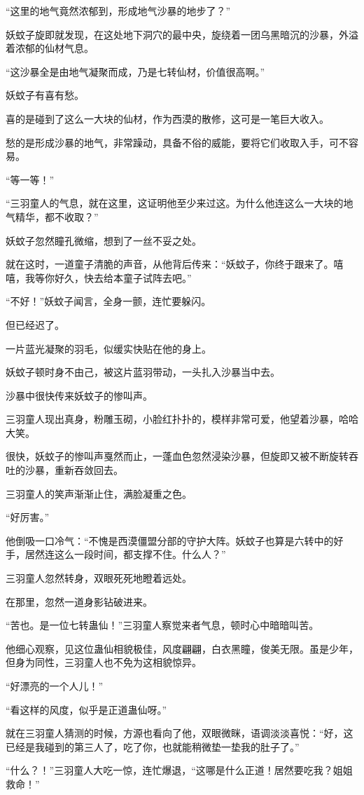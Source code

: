 \begin{this_body}
“这里的地气竟然浓郁到，形成地气沙暴的地步了？”

妖蚊子旋即就发现，在这处地下洞穴的最中央，旋绕着一团乌黑暗沉的沙暴，外溢着浓郁的仙材气息。

“这沙暴全是由地气凝聚而成，乃是七转仙材，价值很高啊。”

妖蚊子有喜有愁。

喜的是碰到了这么一大块的仙材，作为西漠的散修，这可是一笔巨大收入。

愁的是形成沙暴的地气，非常躁动，具备不俗的威能，要将它们收取入手，可不容易。

“等一等！”

“三羽童人的气息，就在这里，这证明他至少来过这。为什么他连这么一大块的地气精华，都不收取？”

妖蚊子忽然瞳孔微缩，想到了一丝不妥之处。

就在这时，一道童子清脆的声音，从他背后传来：“妖蚊子，你终于跟来了。嘻嘻，我等你好久，快去给本童子试阵去吧。”

“不好！”妖蚊子闻言，全身一颤，连忙要躲闪。

但已经迟了。

一片蓝光凝聚的羽毛，似缓实快贴在他的身上。

妖蚊子顿时身不由己，被这片蓝羽带动，一头扎入沙暴当中去。

沙暴中很快传来妖蚊子的惨叫声。

三羽童人现出真身，粉雕玉砌，小脸红扑扑的，模样非常可爱，他望着沙暴，哈哈大笑。

很快，妖蚊子的惨叫声戛然而止，一蓬血色忽然浸染沙暴，但旋即又被不断旋转吞吐的沙暴，重新吞敛回去。

三羽童人的笑声渐渐止住，满脸凝重之色。

“好厉害。”

他倒吸一口冷气：“不愧是西漠僵盟分部的守护大阵。妖蚊子也算是六转中的好手，居然连这么一段时间，都支撑不住。什么人？”

三羽童人忽然转身，双眼死死地瞪着远处。

在那里，忽然一道身影钻破进来。

“苦也。是一位七转蛊仙！”三羽童人察觉来者气息，顿时心中暗暗叫苦。

他细心观察，见这位蛊仙相貌极佳，风度翩翩，白衣黑瞳，俊美无限。虽是少年，但身为同性，三羽童人也不免为这相貌惊异。

“好漂亮的一个人儿！”

“看这样的风度，似乎是正道蛊仙呀。”

就在三羽童人猜测的时候，方源也看向了他，双眼微眯，语调淡淡喜悦：“好，这已经是我碰到的第三人了，吃了你，也就能稍微垫一垫我的肚子了。”

“什么？！”三羽童人大吃一惊，连忙爆退，“这哪是什么正道！居然要吃我？姐姐救命！”

\end{this_body}

